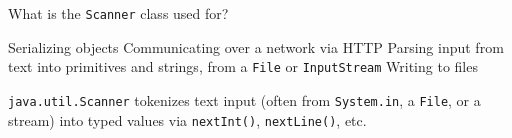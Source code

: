 \question[4]
What is the \texttt{Scanner} class used for?
\begin{choices}
  \choice Serializing objects
  \choice Communicating over a network via HTTP
  \CorrectChoice Parsing input from text into primitives and strings, from a \texttt{File} or \texttt{InputStream}
  \choice Writing to files
\end{choices}
\begin{solution}
  \texttt{java.util.Scanner} tokenizes text input (often from \texttt{System.in}, a \texttt{File}, or a stream) into typed values via \texttt{nextInt()}, \texttt{nextLine()}, etc.
\end{solution}

